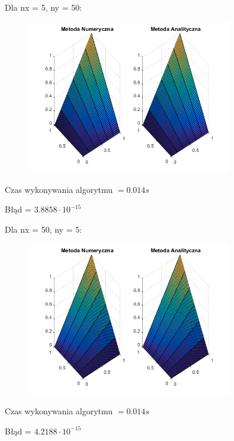 Dla nx = 5, ny = 50:

\begin{figure}[!ht]
	\begin{center}
		\includegraphics[width=0.8\textwidth]{Lab5/charts/zad1/5x50.png}
	\end{center}
\end{figure}

Czas wykonywania algorytmu $ = 0.014 s$

Błąd = $3.8858\cdot 10^{-15}$

Dla nx = 50, ny = 5:

\begin{figure}[!ht]
	\begin{center}
		\includegraphics[width=0.8\textwidth]{Lab5/charts/zad1/50x5.png}
	\end{center}
\end{figure}

Czas wykonywania algorytmu $ = 0.014 s$

Błąd = $4.2188\cdot 10^{-15}$

